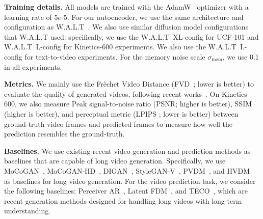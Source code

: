 \vspace{0.02in}
\noindent\textbf{Training details.}
All models are trained with the AdamW~\citep{loshchilov2018decoupled} optimizer with a learning rate of 5$e$-5. For our autoencoder, we use the same architecture and configuration as W.A.L.T~\citep{gupta2023photorealistic}. We also use similar diffusion model configurations that W.A.L.T used: specifically, we use the W.A.L.T~XL-config for UCF-101 and W.A.L.T~L-config for Kinetics-600 experiments. We also use the W.A.L.T~L-config for text-to-video experiments. For the memory noise scale $\sigma_{\mathrm{mem}}$, we use 0.1 in all experiments.

\vspace{0.02in}
\noindent\textbf{Metrics.}
We mainly use the Fr\`echet Video Distance (FVD~\citep{unterthiner2018towards}; lower is better) to evaluate the quality of generated videos, following recent works~\citep{yu2023video,skorokhodov2021stylegan,kim2024hybrid}. On Kinetics-600, we also measure Peak signal-to-noise ratio (PSNR; higher is better), SSIM (higher is better), and perceptual metric (LPIPS \citep{zhang2018perceptual}; lower is better) between ground-truth video frames and predicted frames to measure how well the prediction resembles the ground-truth. 

\vspace{0.02in}
\noindent\textbf{Baselines.}
We use existing recent video generation and prediction methods as baselines that are capable of long video generation. Specifically, we use MoCoGAN~\citep{tulyakov2018mocogan}, MoCoGAN-HD~\citep{tian2021good}, DIGAN~\citep{yu2022digan}, StyleGAN-V~\citep{skorokhodov2021stylegan}, PVDM~\citep{yu2023video}, and HVDM~\citep{kim2024hybrid} as baselines for long video generation. For the video prediction task, we consider the following baselines: Perceiver AR~\citep{hawthorne2022general}, Latent FDM~\citep{harvey2022flexible}, and TECO~\citep{yan2023temporally}, which are recent generation methods designed for handling long videos with long-term understanding.




 
